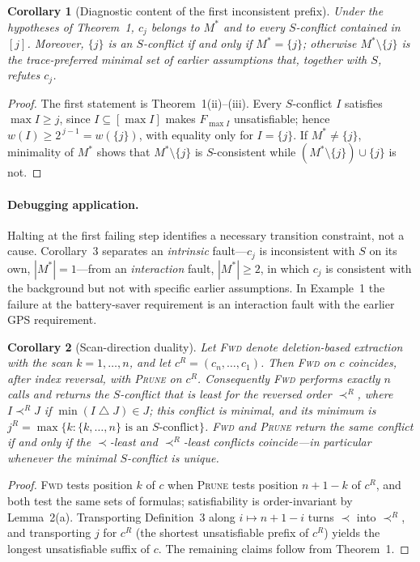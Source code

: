\documentclass[11pt,reqno]{amsart}
\theoremstyle{plain}
\newtheorem{corollary}{Corollary}
\theoremstyle{definition}
\newcommand{\Mstar}{M^{*}}
\newcommand{\sd}{\mathbin{\triangle}}        %
\newcommand{\PRUNE}{\textsc{Prune}}
\newcommand{\FWD}{\textsc{Fwd}}
\begin{document}
\begin{corollary}[Diagnostic content of the first inconsistent prefix]
Under the hypotheses of Theorem~1, $c_j$ belongs to $\Mstar$ and to every
$S$-conflict contained in $[j]$. Moreover, $\{j\}$ is an $S$-conflict if and only if
$\Mstar=\{j\}$; otherwise $\Mstar\setminus\{j\}$ is the trace-preferred minimal set
of earlier assumptions that, together with $S$, refutes $c_j$.
\end{corollary}
\begin{proof}
The first statement is Theorem~1(ii)--(iii). Every $S$-conflict $I$ satisfies
$\max I\ge j$, since $I\subseteq[\max I]$ makes $F_{\max I}$ unsatisfiable; hence
$w(I)\ge2^{\,j-1}=w(\{j\})$, with equality only for $I=\{j\}$. If $\Mstar\ne\{j\}$,
minimality of $\Mstar$ shows that $\Mstar\setminus\{j\}$ is $S$-consistent while
$(\Mstar\setminus\{j\})\cup\{j\}$ is not.
\end{proof}

\paragraph{Debugging application.} Halting at the first failing step identifies a
necessary transition constraint, not a cause. Corollary~3 separates an
\emph{intrinsic} fault---$c_j$ is inconsistent with $S$ on its own,
$|\Mstar|=1$---from an \emph{interaction} fault, $|\Mstar|\ge2$, in which $c_j$ is
consistent with the background but not with specific earlier assumptions. In
Example~1 the failure at the battery-saver requirement is an interaction fault with
the earlier GPS requirement.

\begin{corollary}[Scan-direction duality]
Let \FWD{} denote deletion-based extraction with the scan $k=1,\dots,n$, and let
$c^R=(c_n,\dots,c_1)$. Then \FWD{} on $c$ coincides, after index reversal, with
\PRUNE{} on $c^R$. Consequently \FWD{} performs exactly $n$ calls and returns the
$S$-conflict that is least for the reversed order $\prec^R$, where $I\prec^R J$ if
$\min(I\sd J)\in J$; this conflict is minimal, and its minimum is
$j^R=\max\{k:\{k,\dots,n\}\text{ is an }S\text{-conflict}\}$. \FWD{} and \PRUNE{}
return the same conflict if and only if the $\prec$-least and $\prec^R$-least
conflicts coincide---in particular whenever the minimal $S$-conflict is unique.
\end{corollary}
\begin{proof}
\FWD{} tests position $k$ of $c$ when \PRUNE{} tests position $n+1-k$ of $c^R$, and
both test the same sets of formulas; satisfiability is order-invariant by
Lemma~2(a). Transporting Definition~3 along $i\mapsto n+1-i$ turns $\prec$ into
$\prec^R$, and transporting $j$ for $c^R$ (the shortest unsatisfiable prefix of
$c^R$) yields the longest unsatisfiable suffix of $c$. The remaining claims follow
from Theorem~1.
\end{proof}
\end{document}
